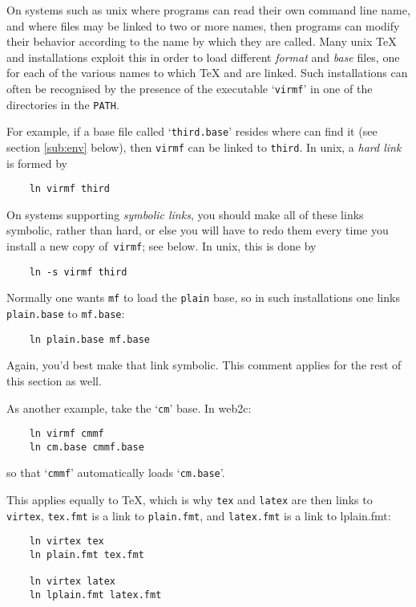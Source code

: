 On systems such as {\sc unix} where programs can read their own
command line name, and where files may be linked to two or more
names, then programs can modify their behavior according to the
name by which they are called.  Many {\sc unix} \TeX{} and \MF{}
installations exploit this in order to load different {\em format\/}
and {\em base\/} files, one for each of the various names to which
\TeX{} and \MF{} are linked.  Such installations can often
be recognised by the presence of the executable `{\tt virmf}'
in one of the directories in the {\tt PATH}.

For example, if a base file called `{\tt third.base}' resides where
\MF{} can find it (see section \ref{sub:env} below), then
{\tt virmf} can be linked to {\tt third}.
In {\sc unix}, a {\em hard link\/} is formed by
\begin{verbatim}
    ln virmf third
\end{verbatim}

On systems supporting {\em symbolic links\/}, you should make all of
these links symbolic, rather than hard, or else you will have to redo
them every time you install a new copy of~{\tt virmf}; see below.
In {\sc unix}, this is done by
\begin{verbatim}
    ln -s virmf third
\end{verbatim}

Normally one wants {\tt mf} to load the {\tt plain} base,
so in such installations one links {\tt plain.base} to {\tt mf.base}:
\begin{verbatim}
    ln plain.base mf.base
\end{verbatim}
Again, you'd best make that link symbolic.  This comment applies for
the rest of this section as well.

As another example, take the `{\tt cm}' base.  In {\sf web2c}:
\begin{verbatim}
    ln virmf cmmf
    ln cm.base cmmf.base
\end{verbatim}
so that `{\tt cmmf}' automatically loads `{\tt cm.base}'.

This applies equally to \TeX{}, which is why {\tt tex} and {\tt latex}
are then links to {\tt virtex}, {\tt tex.fmt} is a link to
{\tt plain.fmt}, and {\tt latex.fmt} is a link to {lplain.fmt}:
\begin{verbatim}
    ln virtex tex
    ln plain.fmt tex.fmt

    ln virtex latex
    ln lplain.fmt latex.fmt
\end{verbatim}

